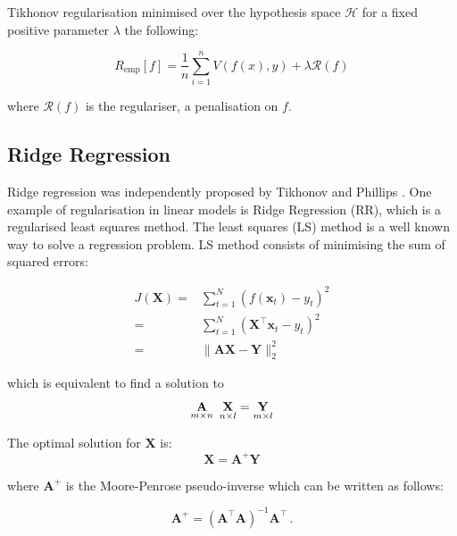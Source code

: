 Tikhonov regularisation minimised over the hypothesis space $\mathcal{H}$ for a fixed positive parameter $\lambda$ the following:

\begin{equation} 
\label{eq:rerm}
R_{\text{emp}}[f] = \frac{1}{n} \sum_{i=1}^n V(f(x),y) + \lambda \mathcal{R}(f)
\end{equation}

\noindent where $\mathcal{R}(f)$ is the regulariser, a penalisation on $f$.

\subsection{Ridge Regression}

Ridge regression was independently proposed by Tikhonov \cite{tikhonov1963} and Phillips \cite{phillips1962}. 
One example of regularisation in linear models is Ridge Regression (RR), which is a regularised least squares method.
The least squares (LS) method is a well known way to solve a regression
problem. 
LS method consists of minimising the sum of squared errors:

\begin{eqnarray*}
\label{eq:lsm}
 J(\mathbf{X}) =& \displaystyle \sum_{t=1}^N (f(\mathbf{x}_t)-y_t)^2 \\
 =&\displaystyle \sum_{t=1}^N (\mathbf{\mathbf{X}}^\top {\mathbf{x}}_t-y_t)^2 \\
 =& \| \mathbf{A}\mathbf{\mathbf{X}} - \mathbf{Y} \|_2^2 
\end{eqnarray*}

\noindent which is equivalent to find a solution to 
\begin{equation}
\label{eq:regproblem}
\underset{m \times n}{\mathbf{A}} \enskip \underset{n \times
l}{\mathbf{\mathbf{X}}} = \underset{m \times l}{\mathbf{Y}}
\end{equation}

The optimal solution for $\mathbf{\mathbf{X}}$ is:
\begin{equation}
\label{eq:MP}
\mathbf{\mathbf{X}}= \mathbf{A}^+ \mathbf{Y}
\end{equation}

\noindent where $\mathbf{A}^+$ is the Moore-Penrose pseudo-inverse
which can be written as follows: 

\begin{equation}
\label{eq:pseudoinverse}
\mathbf{A}^+= (\mathbf{A}^\top \mathbf{A})^{-1}\mathbf{A}^\top \, .
\end{equation}

